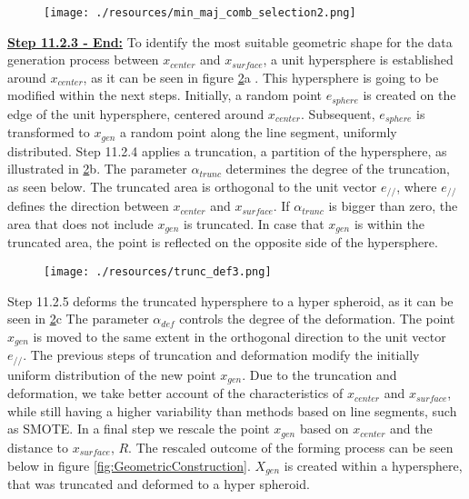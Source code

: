 \documentclass[parskip=full]{scrartcl}
\begin{document}
\begin{figure}[H]
	\centering
	\texttt{[image: ./resources/min\_maj\_comb\_selection2.png]}
	\label{fig:Combined}
\end{figure}

\textbf{\underline{Step 11.2.3 - End:}} To identify the most suitable geometric shape for the data 
generation process between $x_{center}$ and $x_{surface}$, a unit hypersphere is established around 
$x_{center}$, as it can be seen in figure \ref{fig:Hypersphere}a . This hypersphere is going to be modified 
within the next steps. Initially, a random point $e_{sphere}$ is created on the edge of the unit 
hypersphere, centered around $x_{center}$. Subsequent, $e_{sphere}$ is transformed to $x_{gen}$ a 
random point along the line segment, uniformly distributed. Step 11.2.4 applies a truncation, a partition 
of the hypersphere, as illustrated in \ref{fig:Hypersphere}b. The parameter $\alpha_{trunc}$ determines 
the degree of the truncation, as seen below. The truncated area is orthogonal to the unit vector $e_{//}$, 
where $e_{//}$ defines the direction between $x_{center}$ and $x_{surface}$. If $\alpha_{trunc}$ is bigger 
than zero, the area that does not include $x_{gen}$ is truncated. In case that $x_{gen}$ is within the 
truncated area, the point is reflected on the opposite side of the hypersphere.
\\

\begin{figure}[H]
	\centering
	\texttt{[image: ./resources/trunc\_def3.png]}
	\label{fig:Hypersphere}
\end{figure}

Step 11.2.5 deforms the truncated hypersphere to a hyper spheroid, as it can be seen in \ref{fig:Hypersphere}c 
The parameter $\alpha_{def}$ controls the degree of the deformation. The point $x_{gen}$ is moved to the same 
extent in the orthogonal direction to the unit vector $e_{//}$. The previous steps of truncation and 
deformation modify the initially uniform distribution of the new point $x_{gen}$. Due to the truncation 
and deformation, we take better account of the characteristics of $x_{center}$ and $x_{surface}$, 
while still having a higher variability than methods based on line segments, such as SMOTE. In a final 
step we rescale the point $x_{gen}$ based on $x_{center}$ and the distance to $x_{surface}$, $R$. The 
rescaled outcome of the forming process can be seen below in figure \ref{fig:GeometricConstruction}. 
$X_{gen}$ is created within a hypersphere, that was truncated and deformed to a hyper spheroid.
\end{document}
